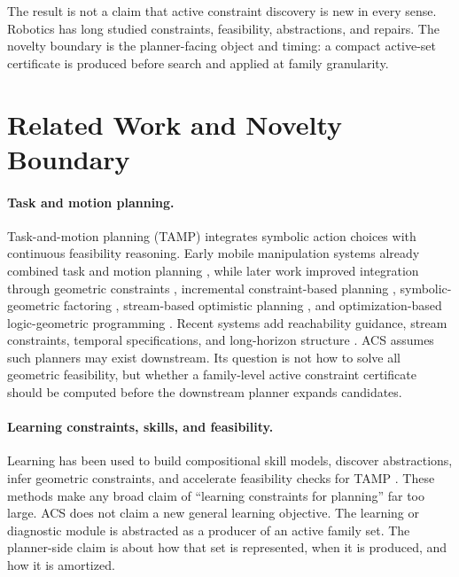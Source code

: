 \documentclass{article}
\newcommand{\ACS}{\textsc{ACS}}
\begin{document}
The result is not a claim that active constraint discovery is new in every sense. Robotics has long studied constraints, feasibility, abstractions, and repairs. The novelty boundary is the planner-facing object and timing: a compact active-set certificate is produced before search and applied at family granularity.

\section{Related Work and Novelty Boundary}

\paragraph{Task and motion planning.}
Task-and-motion planning (TAMP) integrates symbolic action choices with continuous feasibility reasoning. Early mobile manipulation systems already combined task and motion planning \citep{wolfe2010combined,kaelbling2011hierarchical}, while later work improved integration through geometric constraints \citep{lagriffoul2014efficiently}, incremental constraint-based planning \citep{dantam2016incremental,dantam2018incremental}, symbolic-geometric factoring \citep{garrett2017ffrob,garrett2018sampling}, stream-based optimistic planning \citep{garrett2020pddlstream}, and optimization-based logic-geometric programming \citep{toussaint2015logic}. Recent systems add reachability guidance, stream constraints, temporal specifications, and long-horizon structure \citep{takano2021continuous,hartmann2022long,ly2024rlgp,vu2024coast}. \ACS{} assumes such planners may exist downstream. Its question is not how to solve all geometric feasibility, but whether a family-level active constraint certificate should be computed before the downstream planner expands candidates.

\paragraph{Learning constraints, skills, and feasibility.}
Learning has been used to build compositional skill models, discover abstractions, infer geometric constraints, and accelerate feasibility checks for TAMP \citep{wang2021compositional,curtis2022discovering,ren2022learning,xu2022accelerating,aitbouhsain2023simultaneous}. These methods make any broad claim of ``learning constraints for planning'' far too large. \ACS{} does not claim a new general learning objective. The learning or diagnostic module is abstracted as a producer of an active family set. The planner-side claim is about how that set is represented, when it is produced, and how it is amortized.
\end{document}
